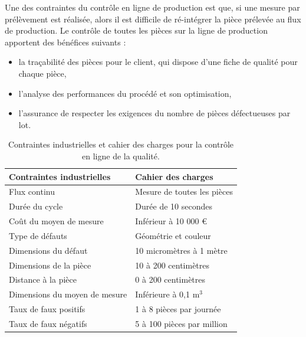 Une des contraintes du contrôle en ligne de production est que, si une mesure par prélèvement est réalisée, alors il est difficile de ré-intégrer la pièce prélevée au flux de production.
Le contrôle de toutes les pièces sur la ligne de production apportent des bénéfices suivants :
\begin{itemize}
	\item la traçabilité des pièces pour le client, qui dispose d'une fiche de qualité pour chaque pièce,
	\item l'analyse des performances du procédé et son optimisation,
	\item l'assurance de respecter les exigences du nombre de pièces défectueuses par lot.
\end{itemize}

\begin{table}[bthp]
	\centering
	\begin{tabular}{|l|l|}
		\arrayrulecolor{black}
		\hline
		Contraintes industrielles & Cahier des charges \\ \hline
		\hline
		Flux continu & Mesure de toutes les pièces \\ \hline
		Durée du cycle & Durée de 10 secondes \\ \hline
		Coût du moyen de mesure & Inférieur à 10 000 € \\ \hline
		\hline
		Type de défauts & Géométrie et couleur \\ \hline \hline
		Dimensions du défaut & 10 micromètres à 1 mètre \\ \hline
		Dimensions de la pièce & 10 à 200 centimètres \\ \hline
		\hline
		Distance à la pièce & 0 à 200 centimètres \\ \hline
		Dimensions du moyen de mesure & Inférieure à 0,1 m$^3$ \\ \hline
		\hline
		Taux de faux positifs & 1 à 8 pièces par journée \\ \hline
		Taux de faux négatifs & 5 à 100 pièces par million \\ \hline
	\end{tabular}
	\caption{Contraintes industrielles et cahier des charges pour la contrôle en ligne de la qualité.}
	\label{tab:industrial_constraints}
\end{table}

